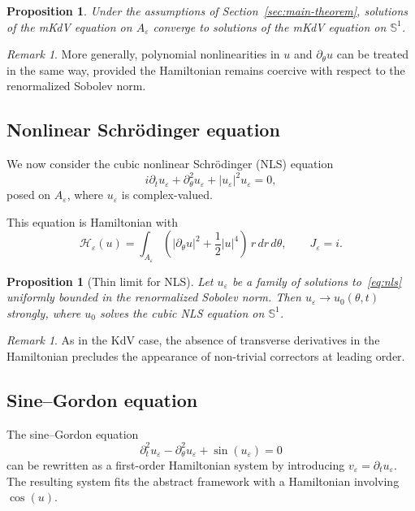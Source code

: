 \documentclass[11pt]{amsart}
\theoremstyle{plain}
\newtheorem{proposition}[theorem]{Proposition}
\theoremstyle{definition}
\theoremstyle{remark}
\newtheorem{remark}[theorem]{Remark}
\theoremstyle{remark}
\begin{document}
\begin{proposition}
Under the assumptions of Section~\ref{sec:main-theorem}, solutions of the mKdV
equation on $A_\varepsilon$ converge to solutions of the mKdV equation on
$\mathbb S^1$.
\end{proposition}

\begin{remark}
More generally, polynomial nonlinearities in $u$ and $\partial_\theta u$ can be
treated in the same way, provided the Hamiltonian remains coercive with respect
to the renormalized Sobolev norm.
\end{remark}

\subsection{Nonlinear Schr\"odinger equation}

We now consider the cubic nonlinear Schr\"odinger (NLS) equation
\begin{equation}
\label{eq:nls}
i\partial_t u_\varepsilon
+
\partial_\theta^2 u_\varepsilon
+
|u_\varepsilon|^2u_\varepsilon
=0,
\end{equation}
posed on $A_\varepsilon$, where $u_\varepsilon$ is complex-valued.

This equation is Hamiltonian with
\[
\mathcal H_\varepsilon(u)
=
\int_{A_\varepsilon}
\left(
|\partial_\theta u|^2
+
\frac12|u|^4
\right)
\,r\,dr\,d\theta,
\qquad
J_\varepsilon=i.
\]

\begin{proposition}[Thin limit for NLS]
Let $u_\varepsilon$ be a family of solutions to~\eqref{eq:nls} uniformly bounded
in the renormalized Sobolev norm.
Then $u_\varepsilon\to u_0(\theta,t)$ strongly, where $u_0$ solves the cubic NLS
equation on $\mathbb S^1$.
\end{proposition}

\begin{remark}
As in the KdV case, the absence of transverse derivatives in the Hamiltonian
precludes the appearance of non-trivial correctors at leading order.
\end{remark}

\subsection{Sine--Gordon equation}

The sine--Gordon equation
\[
\partial_t^2 u_\varepsilon
-
\partial_\theta^2 u_\varepsilon
+
\sin(u_\varepsilon)
=0
\]
can be rewritten as a first-order Hamiltonian system by introducing
$v_\varepsilon=\partial_t u_\varepsilon$.
The resulting system fits the abstract framework with a Hamiltonian involving
$\cos(u)$.
\end{document}
